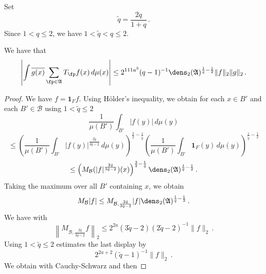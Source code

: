 Set
\begin{equation}
    \tilde{q}=\frac {2q}{1+q}\,.
\end{equation}
Since $1< q\le 2$, we have $1<\tilde{q}<q\le 2$.
\begin{lemma}
\label{dens2-antichain}
\leanok
{}
We have that
\begin{equation}\label{eqttt9}
  \left|\int \overline{g(x)} \sum_{\fp \in \mathfrak{A}} T_{\fp} f(x)\, d\mu(x)\right|\le
  2^{111a^3}({q}-1)^{-1} \dens_2(\mathfrak{A})^{\frac 1{\tilde{q}}-\frac 12} \|f\|_2\|g\|_2\, .
\end{equation}
\end{lemma}
\begin{proof}
We have $f=\mathbf{1}_Ff$. Using H\"older's inequality, we obtain for
each $x\in B'$ and each $B'\in \mathcal{B}$ using $1<\tilde{q}\le 2$
\begin{equation}
    \frac 1{\mu(B')}\int_{B'} |f(y)|\, d\mu(y)
\end{equation}
\begin{equation}
    \le
    \left(\frac 1{\mu(B')}\int_{B'} |f(y)|^{\frac {2{\tilde{q}}}{3\tilde{q}-2}}\, d\mu(y)\right)^{\frac 32-\frac 1{\tilde{q}}}
    \left(\frac 1{\mu(B')}\int_{B'} \mathbf{1}_F(y)\, d\mu(y)\right)^{\frac 1{\tilde{q}}-\frac 12}
\end{equation}
\begin{equation}
    \le \left(M_{\mathcal{B}} (|f|^{\frac {2{\tilde{q}}}{3{\tilde{q}}-2}})(x)\right)^{\frac 32-\frac 1{\tilde{q}}}
\dens_2(\mathfrak{A})^{\frac 1{\tilde{q}}-\frac 12}\, .
\end{equation}
Taking the maximum over all $B'$ containing $x$, we obtain
\begin{equation} \label{eqttt1}
    M_{\mathcal{B}}|f|\le
    M_{\mathcal{B},\frac {2{\tilde{q}}}{3{\tilde{q}}-2} } |f|
    \dens_2(\mathfrak{A})^{\frac 1{\tilde{q}}-\frac 12}\, .
\end{equation}
We have with 
\begin{equation}
\left\|M_{\mathcal{B}, \frac {2{\tilde{q}}}{3{\tilde{q}}-2}} f\right\|_2\le 2^{2a}(3\tilde{q}-2)(2\tilde{q}-2)^{-1}\|f\|_2\, .
\end{equation}
Using $1<\tilde{q}\le 2$ estimates the last display by
\begin{equation}\label{eqttt2}
 2^{2a+2} (\tilde{q}-1)^{-1} \|f\|_2\, .
\end{equation}
We obtain with Cauchy-Schwarz
and then 

\end{proof}
